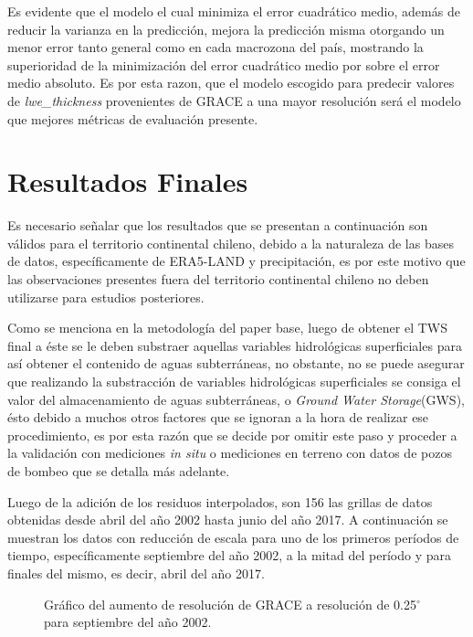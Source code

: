 Es evidente que el modelo el cual minimiza el error cuadrático medio, además de reducir la varianza en la predicción, mejora la predicción misma otorgando un menor error tanto
general como en cada macrozona del país, mostrando la superioridad de la minimización del error cuadrático medio por sobre el error medio absoluto. Es por esta razon, que el modelo escogido para 
predecir valores de \textit{lwe\_thickness} provenientes de GRACE a una mayor resolución será el modelo que mejores métricas de evaluación presente.
%
%
%
%
\section{Resultados Finales}
Es necesario señalar que los resultados que se presentan a continuación son válidos para el territorio continental chileno, debido a la naturaleza de las bases de datos, específicamente de ERA5-LAND y precipitación, es 
por este motivo que las observaciones presentes fuera del territorio continental chileno no deben utilizarse para estudios posteriores.

Como se menciona en la metodología del paper base\cite{11}, luego de obtener el TWS final a éste se le deben substraer aquellas variables hidrológicas superficiales para así
obtener el contenido de aguas subterráneas, no obstante, no se puede asegurar que realizando la substracción de variables hidrológicas superficiales se consiga el valor del almacenamiento de aguas subterráneas, o 
\textit{Ground Water Storage}(GWS), ésto debido a muchos otros factores que se ignoran a la hora de realizar ese procedimiento, es por esta razón que se decide por omitir este paso y proceder a la validación con mediciones \textit{in situ} o mediciones en terreno con datos de pozos de bombeo que 
se detalla más adelante.

Luego de la adición de los residuos interpolados, son 156 las grillas de datos obtenidas desde abril del año 2002 hasta junio del año 2017. A continuación se muestran los datos con reducción de escala para
uno de los primeros períodos de tiempo, específicamente septiembre del año 2002, a la mitad del período y para finales del mismo, es decir, abril del año 2017.

\begin{figure}[H]
    \centering
          \goodgap
          \vskip -0.1in
    \caption[\textit{Downscalling} final para el mes 09/2002]{Gráfico del aumento de resolución de GRACE a resolución de 0.25$^{\circ}$ para septiembre del año 2002.}
    \label{dsf02}
\end{figure}


